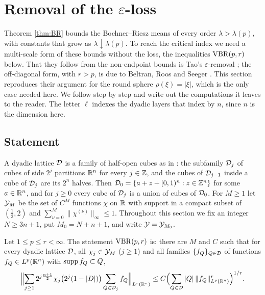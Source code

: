 \section{Removal of the \texorpdfstring{$\varepsilon$}{epsilon}-loss}\label{sec:vbr}

Theorem \ref{thm:BR} bounds the Bochner--Riesz means of every order $\lambda>\lambda(p)$, with constants
that grow as $\lambda\downarrow\lambda(p)$. To reach the critical index we need a multi-scale form of
these bounds without the loss, the inequalities $\mathrm{VBR}(p,r)$ below. That they follow from the
non-endpoint bounds is Tao's $\varepsilon$-removal \cite{Tao98}; the off-diagonal form, with $r>p$, is
due to Beltran, Roos and Seeger \cite{BRS23}. This section reproduces their argument for the round
sphere $\rho(\xi)=|\xi|$, which is the only case needed here. We follow \cite{BRS23} step by step and
write out the computations it leaves to the reader. The letter $\ell$ indexes the dyadic layers that
\cite{BRS23} index by $n$, since $n$ is the dimension here.

\subsection{Statement}\label{ssec:vbrstatement}
A dyadic lattice $\mathcal D$ is a family of half-open cubes as in \cite[\S2]{LN19}: the subfamily $\mathcal D_j$ of
cubes of side $2^j$ partitions $\mathbb{R}^n$ for every $j\in\mathbb{Z}$, and the cubes of $\mathcal D_{j-1}$ inside a cube of
$\mathcal D_j$ are its $2^n$ halves. Then $\mathcal D_0=\{a+z+[0,1)^n:z\in\mathbb{Z}^n\}$ for some $a\in\mathbb{R}^n$, and for $j\ge0$
every cube of $\mathcal D_j$ is a union of cubes of $\mathcal D_0$. For $M\ge1$ let $\mathcal Y_M$ be the set of $C^M$
functions $\chi$ on $\mathbb{R}$ with support in a compact subset of $(\frac12,2)$ and
$\sum_{\nu=0}^M\|\chi^{(\nu)}\|_\infty\le1$. Throughout this section we fix an integer $N\ge3n+1$, put
$M_0=N+n+1$, and write $\mathcal Y=\mathcal Y_{M_0}$.

\begin{definition}\label{def:vbr}
Let $1\le p\le r<\infty$. The statement $\mathrm{VBR}(p,r)$ is: there are $M$ and $C$ such that for every
dyadic lattice $\mathcal D$, all $\chi_j\in\mathcal Y_M$ ($j\ge1$) and all families $\{f_Q\}_{Q\in\mathcal D}$ of functions
$f_Q\in L^p(\mathbb{R}^n)$ with $\operatorname{supp} f_Q\subset Q$,
\begin{equation}\label{eq:vbr}
\Bigl\|\sum_{j\ge1}2^{j\frac{n+1}2}\chi_j\bigl(2^j(1-|D|)\bigr)\sum_{Q\in\mathcal D_j}f_Q\Bigr\|_{L^r(\mathbb{R}^n)}
\le C\Bigl(\sum_{Q\in\mathcal D}|Q|\,\|f_Q\|_{L^p(\mathbb{R}^n)}^r\Bigr)^{1/r}.
\end{equation}
\end{definition}

